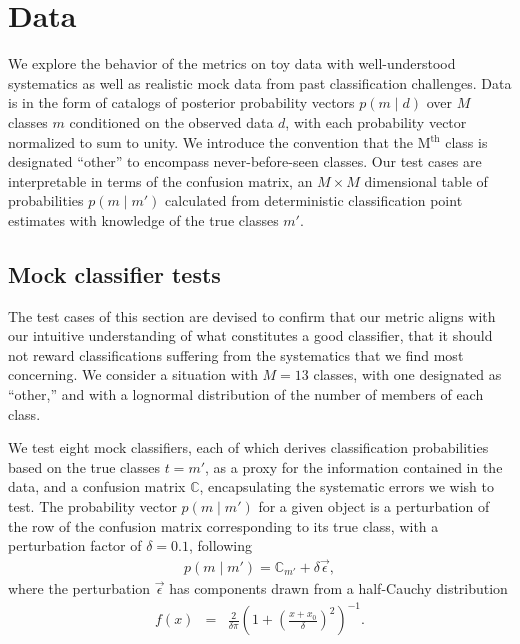 \section{Data}
\label{sec:data}

We explore the behavior of the metrics on toy data with well-understood systematics as well as realistic mock data from past classification challenges.
Data is in the form of catalogs of posterior probability vectors $p(m \mid d)$ over $M$ classes $m$ conditioned on the observed data $d$, with each probability vector normalized to sum to unity.
We introduce the convention that the M$^{\mathrm{th}}$ class is designated ``other'' to encompass never-before-seen classes.
Our test cases are interpretable in terms of the confusion matrix, an $M\times M$ dimensional table of probabilities $p(m \mid m')$ calculated from deterministic classification point estimates with knowledge of the true classes $m'$.

\subsection{Mock classifier tests}
\label{sec:mockdata}

The test cases of this section are devised to confirm that our metric aligns with our intuitive understanding of what constitutes a good classifier, that it should not reward classifications suffering from the systematics that we find most concerning.
We consider a situation with $M=13$ classes, with one designated as ``other,'' and with a lognormal distribution of the number of members of each class.

We test eight mock classifiers, each of which derives classification probabilities based on the true classes $t = m'$, as a proxy for the information contained in the data, and a confusion matrix $\mathbb{C}$, encapsulating the systematic errors we wish to test.
The probability vector $p(m \mid m')$ for a given object is a perturbation of the row of the confusion matrix corresponding to its true class, with a perturbation factor of $\delta=0.1$, following
\begin{eqnarray}
  \label{eq:cmtoprob}
  p(m \mid m') = \mathbb{C}_{m'} + \delta\vec{\epsilon},
\end{eqnarray}
where the perturbation $\vec{\epsilon}$ has components drawn from a half-Cauchy distribution
\begin{eqnarray}
  \label{eq:cauchy}
  f(x) &=& \frac{2}{\delta\pi}\left(1+\left(\frac{x+x_{0}}{\delta}\right)^{2}\right)^{-1}.
\end{eqnarray}

